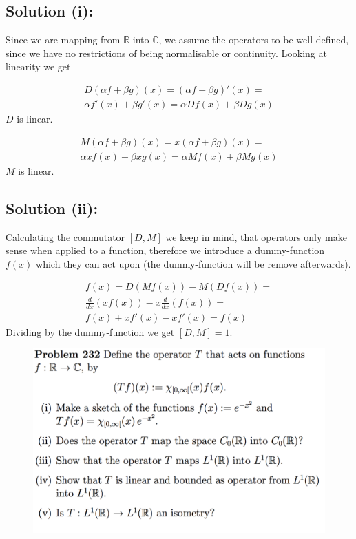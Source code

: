 \documentclass{article}
\begin{document}
\subsection*{Solution (i):}
Since we are mapping from $\mathbb{R}$ into $\mathbb{C}$, we assume the operators to be well defined, since we have no restrictions of being normalisable or continuity. Looking at linearity we get

\begin{gather*}
    D(\alpha f + \beta g)(x) = (\alpha f + \beta g)'(x) = \\
    \alpha f'(x) + \beta g'(x) =  \alpha Df(x) + \beta Dg(x) 
\end{gather*}
$D$ is linear.

\begin{gather*}
    M(\alpha f + \beta g)(x) = x(\alpha f + \beta g)(x) =\\
    \alpha xf (x) + \beta xg(x) = \alpha Mf (x) + \beta Mg(x)
\end{gather*}
$M$ is linear.

\subsection*{Solution (ii):}
Calculating the commutator $[D,M]$ we keep in mind, that operators only make sense when applied to a function, therefore we introduce a dummy-function $f(x)$ which they can act upon (the dummy-function will be remove afterwards). 

\begin{gather*}
    [D,M]f(x) = D(Mf(x)) - M(Df(x)) = \\
    \frac{d}{dx}(xf(x)) - x\frac{d}{dx}(f(x)) = \\ f(x)+xf'(x)-xf'(x) = f(x)
\end{gather*}
Dividing by the dummy-function we get $[D,M] = 1$.

\begin{figure}[H]
    \centering
    \includegraphics[width=\textwidth]{fig/opg232}
\end{figure}
\end{document}

